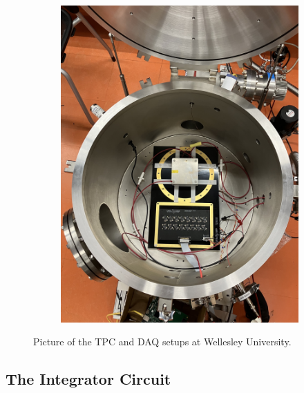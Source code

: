 \begin{figure}[]
\begin{subfigure}{.5\textwidth}
  \includegraphics[width=\textwidth]{images/saq_wellesley_tpc_daq.jpg}
  \caption{}
\end{subfigure}
\caption{Picture of the TPC and DAQ setups at Wellesley University.}
\end{figure}



\subsection{The Integrator Circuit}



